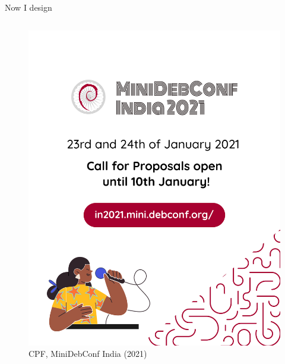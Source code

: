 \documentclass[presentation]{beamer}
\begin{document}
\begin{frame}[label={sec:orged958be}]{Now I design}
\begin{columns}
\begin{column}{0.25\columnwidth}
\begin{figure}[htbp]
\includegraphics[width=.9\linewidth]{././cpfdraft.png}
\caption{CPF, MiniDebConf India (2021)}
\end{figure}
\end{column}
\end{columns}
\end{frame}
\end{document}
